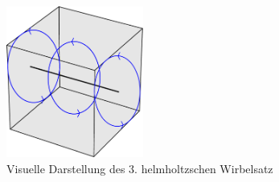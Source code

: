 \begin{figure}
\centering
\includegraphics[width=0.4\textwidth]{papers/wirbelringe/fig/cube_constant_rotation.pdf}
\caption{Visuelle Darstellung des 3. helmholtzschen Wirbelsatz \label{buch:papers:Wirbelringe:fig:Helmholtz_3}}
\end{figure}